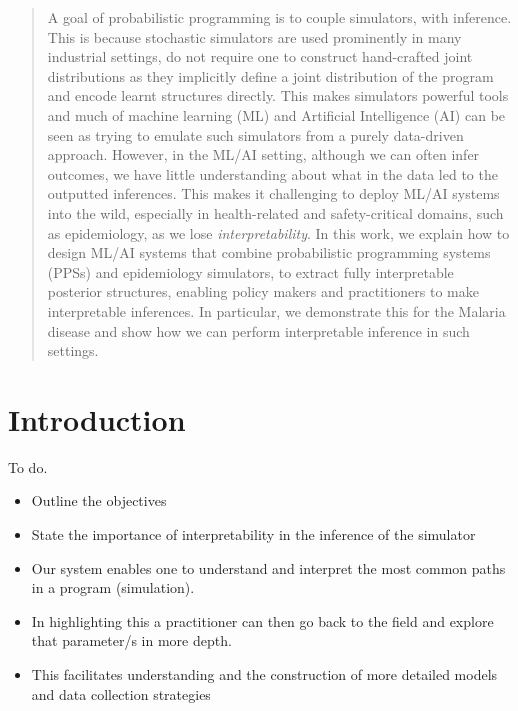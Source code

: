 \documentclass{article}
\begin{document}
\printAffiliationsAndNotice{\icmlEqualContribution} %

\begin{abstract}

A goal of probabilistic programming is to couple simulators, with inference. This is 
because stochastic simulators are used prominently in many industrial settings,
do not require one to construct hand-crafted joint distributions as they implicitly 
define a joint distribution of the program and encode learnt structures 
directly. This makes simulators powerful tools and much of machine learning (ML) and 
Artificial Intelligence (AI)
can be seen as trying to emulate such simulators from a purely data-driven approach.
However, in the 
ML/AI setting, although we can often infer outcomes, we have little understanding about what 
in the data led to the outputted inferences. 
This makes it challenging to deploy ML/AI systems into the wild, especially in health-related and safety-critical domains, such
as epidemiology, as we lose \emph{interpretability}. 
In this work, we explain how to design ML/AI systems that combine
probabilistic programming systems (PPSs) and epidemiology simulators, to extract
fully interpretable posterior structures, enabling policy makers 
and practitioners to make interpretable inferences. 
In particular, we demonstrate this for the Malaria disease and show how we can 
perform interpretable inference in such settings.
\end{abstract}

\section{Introduction}

To do. 

\begin{itemize}

\item Outline the objectives
\item State the importance of interpretability in the inference of the simulator
\item Our system enables one to understand and interpret the most common paths in a program (simulation).
\item In highlighting this a practitioner can then go back to the field and explore that parameter/s in more depth.
\item This facilitates understanding and the construction of more detailed models and data collection strategies


\end{itemize}
\end{document}
